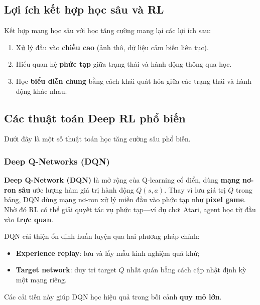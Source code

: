 \subsection{Lợi ích kết hợp học sâu và RL}

\begin{tinhchat}[title={Ba lợi ích chính}]
Kết hợp mạng học sâu với học tăng cường mang lại các lợi ích sau:
\begin{enumerate}
  \item Xử lý đầu vào \textbf{chiều cao} (ảnh thô, dữ liệu cảm biến liên tục).
  \item Hiểu quan hệ \textbf{phức tạp} giữa trạng thái và hành động thông qua học.
  \item Học \textbf{biểu diễn chung} bằng cách khái quát hóa giữa các trạng thái và hành động khác nhau.
\end{enumerate}
\end{tinhchat}

\subsection{Các thuật toán Deep RL phổ biến}

\begin{ynghia}[title={Tổng quan}]
Dưới đây là một số thuật toán học tăng cường sâu phổ biến.
\end{ynghia}

\subsubsection{Deep Q-Networks (DQN)}

\begin{dinhnghia}[title={Deep Q-Network}]
\textbf{Deep Q-Network (DQN)} là mở rộng của Q-learning cổ điển, dùng \textbf{mạng nơ-ron sâu} ước lượng hàm giá trị hành động $Q(s,a)$.
Thay vì lưu giá trị $Q$ trong bảng, DQN dùng mạng nơ-ron xử lý miền đầu vào phức tạp như \textbf{pixel game}.
Nhờ đó RL có thể giải quyết tác vụ phức tạp---ví dụ chơi Atari, agent học từ đầu vào \textbf{trực quan}.
\end{dinhnghia}

\begin{phuongphap}[title={Ổn định huấn luyện DQN}]
DQN cải thiện ổn định huấn luyện qua hai phương pháp chính:
\begin{itemize}
  \item \textbf{Experience replay}: lưu và lấy mẫu kinh nghiệm quá khứ;
  \item \textbf{Target network}: duy trì target $Q$ nhất quán bằng cách cập nhật định kỳ một mạng riêng.
\end{itemize}
Các cải tiến này giúp DQN học hiệu quả trong bối cảnh \textbf{quy mô lớn}.
\end{phuongphap}

